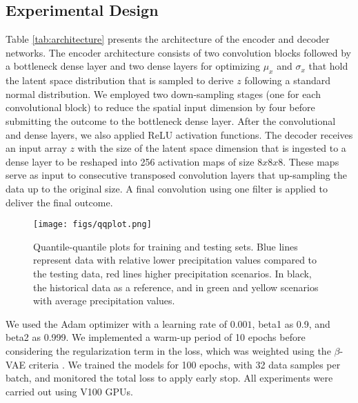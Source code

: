 \documentclass{article}
\begin{document}
\subsection{Experimental Design}

Table \ref{tab:architecture} presents the architecture of the encoder and decoder networks. The encoder architecture consists of two convolution blocks followed by a bottleneck dense layer and two dense layers for optimizing $\mu_x$ and $\sigma_x$ that hold the latent space distribution that is sampled to derive $z$ following a standard normal distribution. We employed two down-sampling stages (one for each convolutional block) to reduce the spatial input dimension by four before submitting the outcome to the bottleneck dense layer. After the convolutional and dense layers, we also applied ReLU activation functions. The decoder receives an input array $z$ with the size of the latent space dimension that is ingested to a dense layer to be reshaped into 256 activation maps of size $8x8x8$. These maps serve as input to consecutive transposed convolution layers that up-sampling the data up to the original size. A final convolution using one filter is applied to deliver the final outcome. 

\begin{figure}[ht!]
	\centering
		\texttt{[image: figs/qqplot.png]}
	\caption{Quantile-quantile plots for training and testing sets. Blue lines represent data with relative lower precipitation values compared to the testing data, red lines higher precipitation scenarios. In black, the historical data as a reference, and in green and yellow scenarios with average precipitation values.}
	\label{fig:qqplot}
\end{figure}

We used the Adam optimizer with a learning rate of $0.001$, beta1 as 0.9, and beta2 as 0.999. We implemented a warm-up period of 10 epochs before considering the regularization term in the loss, which was weighted using the $\beta$-VAE criteria \cite{betavae}. We trained the models for 100 epochs, with 32 data samples per batch, and monitored the total loss to apply early stop. All experiments were carried out using  V100 GPUs. 
\end{document}
